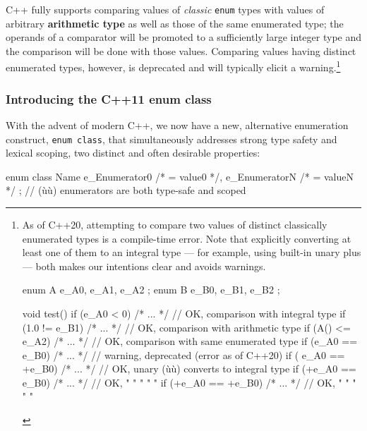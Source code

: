 C++ fully supports comparing values of \emph{classic} \texttt{enum}
types with values of arbitrary \textbf{arithmetic type} as well as those
of the same enumerated type; the operands of a comparator will be
promoted to a sufficiently large integer type and the comparison will be
done with those values. Comparing values having distinct enumerated
types, however, is deprecated and will typically elicit a
warning.{\cprotect\footnote{As of C++20, attempting to compare two values of distinct classically enumerated
types is a compile-time error. Note that explicitly converting at least one of them to an
integral type --- for example, using built-in unary plus --- both
makes our intentions clear and avoids warnings.

\begin{emcppshiddenlisting}[emcppsbatch=e2]
    enum A { e_A0, e_A1, e_A2 };
    enum B { e_B0, e_B1, e_B2 };
\end{emcppshiddenlisting}
\begin{emcppslisting}[emcppsbatch=e2,basicstyle={\ttfamily\footnotesize}]
void test()
{
  if (e_A0 < 0)       { /* ... */ }  // OK, comparison with integral type
  if (1.0 != e_B1)    { /* ... */ }  // OK, comparison with arithmetic type
  if (A() <= e_A2)    { /* ... */ }  // OK, comparison with same enumerated type
  if (e_A0 == e_B0)   { /* ... */ }  // warning, deprecated (error as of C++20)
  if ( e_A0 == +e_B0) { /* ... */ }  // OK, unary (ù{\codeincomments{+}}ù) converts to integral type
  if (+e_A0 ==  e_B0) { /* ... */ }  // OK,   "        "     "     "      "
  if (+e_A0 == +e_B0) { /* ... */ }  // OK,   "        "     "     "      "
}
\end{emcppslisting}
      }}

\subsubsection[Introducing the C++11 {\tt enum class}]{Introducing the C++11 {\SubsubsecCode enum class}}\label{introducing-the-c++11-enum-class}

With the advent of modern C++, we now have a new, alternative
enumeration construct, \texttt{enum}~\texttt{class}, that simultaneously
addresses strong type safety and lexical scoping, two distinct and often
desirable properties:

\begin{emcppslisting}
enum class Name { e_Enumerator0 /* = value0 */, e_EnumeratorN /* = valueN */ };
    // (ù{}ù) enumerators are both type-safe and scoped
\end{emcppslisting}

